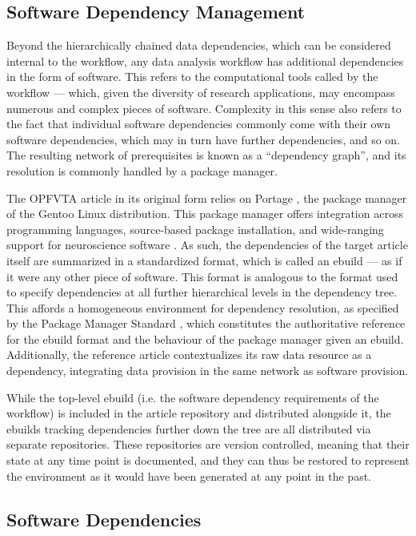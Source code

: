 \subsection{Software Dependency Management}

Beyond the hierarchically chained data dependencies, which can be considered internal to the workflow, any data analysis workflow has additional dependencies in the form of software.
This refers to the computational tools called by the workflow — which, given the diversity of research applications, may encompass numerous and complex pieces of software.
Complexity in this sense also refers to the fact that individual software dependencies commonly come with their own software dependencies, which may in turn have further dependencies, and so on.
The resulting network of prerequisites is known as a “dependency graph”, and its resolution is commonly handled by a package manager.

The OPFVTA article in its original form relies on Portage \cite{portage}, the package manager of the Gentoo Linux distribution.
This package manager offers integration across programming languages, source-based package installation, and wide-ranging support for neuroscience software \cite{ng}.
As such, the dependencies of the target article itself are summarized in a standardized format, which is called an ebuild — as if it were any other piece of software.
This format is analogous to the format used to specify dependencies at all further hierarchical levels in the dependency tree.
This affords a homogeneous environment for dependency resolution, as specified by the Package Manager Standard \cite{pms}, which constitutes the authoritative reference for the ebuild format and the behaviour of the package manager given an ebuild.
Additionally, the reference article contextualizes its raw data resource as a dependency, integrating data provision in the same network as software provision.

While the top-level ebuild (i.e. the software dependency requirements of the workflow) is included in the article repository and distributed alongside it, the ebuilds tracking dependencies further down the tree are all distributed via separate repositories.
These repositories are version controlled, meaning that their state at any time point is documented, and they can thus be restored to represent the environment as it would have been generated at any point in the past.


\subsection{Software Dependencies}

